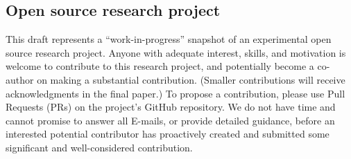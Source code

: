 

\subsection*{Open source research project}

This draft represents a ``work-in-progress'' snapshot
of an experimental open source research project.
Anyone with adequate interest, skills, and motivation
is welcome to contribute to this research project,
and potentially become a co-author on making a substantial contribution.
(Smaller contributions will receive acknowledgments in the final paper.)
To propose a contribution, please use Pull Requests (PRs)
on the project's GitHub repository.
We do not have time and cannot promise to answer all E-mails,
or provide detailed guidance,
before an interested potential contributor has proactively
created and submitted some significant and well-considered contribution.


